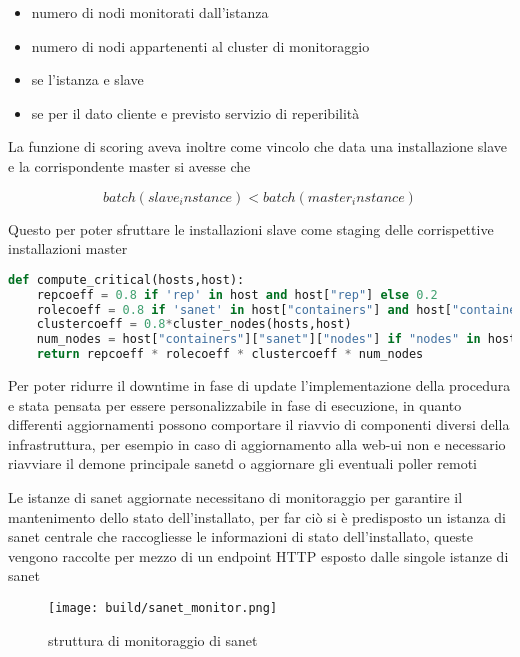 \begin{itemize}
  \item{numero di nodi monitorati dall'istanza}
  \item{numero di nodi appartenenti al cluster di monitoraggio}
  \item{se l'istanza e slave}
  \item{se per il dato cliente e previsto servizio di reperibilità}
\end{itemize}

\newpage
La funzione di scoring aveva inoltre come vincolo che data una installazione slave e la corrispondente master si avesse che

\begin{equation}
  batch(slave_instance) < batch(master_instance)
\end{equation}

Questo per poter sfruttare le installazioni slave come staging delle corrispettive installazioni master

\begin{lstlisting}[language=python]
def compute_critical(hosts,host):
    repcoeff = 0.8 if 'rep' in host and host["rep"] else 0.2
    rolecoeff = 0.8 if 'sanet' in host["containers"] and host["containers"]["sanet"]["role"] == "prod" else 0.2
    clustercoeff = 0.8*cluster_nodes(hosts,host)
    num_nodes = host["containers"]["sanet"]["nodes"] if "nodes" in host["containers"]["sanet"] else 1
    return repcoeff * rolecoeff * clustercoeff * num_nodes
\end{lstlisting}

Per poter ridurre il downtime in fase di update l'implementazione della procedura e stata pensata per essere personalizzabile in fase di esecuzione, in quanto differenti aggiornamenti possono comportare il riavvio di componenti diversi della infrastruttura, per esempio in caso di aggiornamento alla web-ui non e necessario riavviare il demone principale sanetd o aggiornare gli eventuali poller remoti

Le istanze di sanet aggiornate necessitano di monitoraggio per garantire il mantenimento dello stato dell'installato, per far ciò si è predisposto un istanza di sanet centrale che raccogliesse le informazioni di stato dell'installato, queste vengono raccolte per mezzo di un endpoint HTTP esposto dalle singole istanze di sanet

\begin{figure}[H]
    \centering
    \texttt{[image: build/sanet\_monitor.png]}
    \caption{struttura di monitoraggio di sanet}
    \label{fig:sanet_monitor}
\end{figure}

